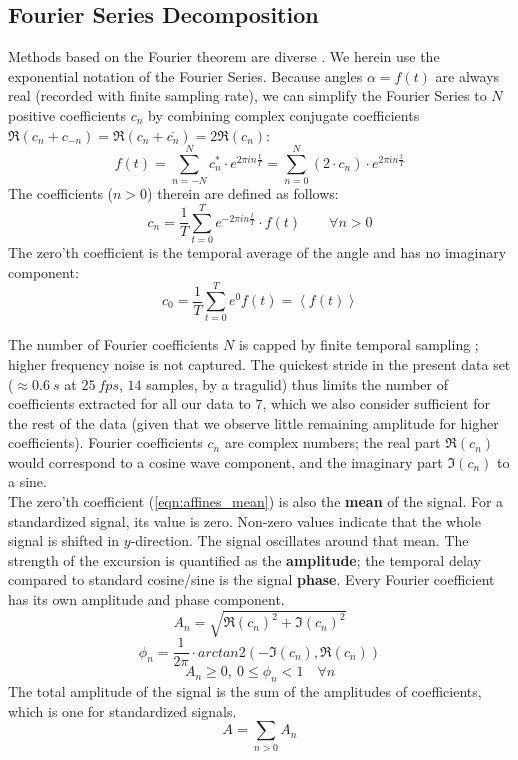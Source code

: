 \documentclass[9pt,twoside,lineno]{pnas-new}
\begin{document}
\subsection{Fourier Series Decomposition}\label{apdx:fourier}
Methods based on the Fourier theorem are diverse \cite{Fourier1822,Gray1995,Bracewell2000}. 
We herein use the exponential notation of the Fourier Series. 
Because angles $\alpha =f(t)$ are always real (recorded with finite sampling rate), we can simplify the Fourier Series to $N$ positive coefficients $c_{n}$ by combining complex conjugate coefficients $\Re(c_n + c_{-n}) = \Re(c_n + \overline{c_n}) = 2\Re(c_{n})$:
	\begin{equation}\label{eqn:fourier_series}
	f(t) = \sum\limits_{n=-N}^{N} c^{*}_{n}\cdot e^{2\pi i n \frac{t}{T}} = \sum\limits_{n=0}^{N} (2\cdot c_{n})\cdot e^{2\pi i n \frac{t}{T}}
	\end{equation}
The coefficients ($n>0$) therein are defined as follows:
	\begin{equation}\label{eqn:fourier_coefficients}
	c_{n} = \frac{1}{T}\sum\limits_{t=0}^{T} e^{-2\pi i n \frac{t}{T}} \cdot f(t)  \quad\quad \forall n>0
	\end{equation}
	The zero'th coefficient is the temporal average of the angle and has no imaginary component: 
	\begin{equation}\label{eqn:affines_mean}
	c_{0} = \frac{1}{T}\sum\limits_{t=0}^{T} e^{0} f(t) = \left\langle f(t)  \right\rangle
	\end{equation}

The number of Fourier coefficients $N$ is capped by finite temporal sampling \cite[Nyquist–Shannon sampling theorem,][]{Nyquist1928,Shannon1949}; higher frequency noise is not captured. 
The quickest stride in the present data set ($\approx 0.6\ s$ at $25\ fps$, $14$ samples, by a tragulid) thus limits the number of coefficients extracted for all our data to $7$, which we also consider sufficient for the rest of the data (given that we observe little remaining amplitude for higher coefficients). 
Fourier coefficients $c_{n}$ are complex numbers; the real part $\Re(c_{n})$ would correspond to a cosine wave component, and the imaginary part $\Im(c_{n})$ to a sine. 
\bigskip\\The zero'th coefficient (\eqref{eqn:affines_mean}) is also the \textbf{mean} of the signal. 
For a standardized signal, its value is zero. 
Non-zero values indicate that the whole signal is shifted in $y$-direction. 
The signal oscillates around that mean. 
The strength of the excursion is quantified as the \textbf{amplitude}; the temporal delay compared to standard cosine/sine is the signal \textbf{phase}. 
Every Fourier coefficient has its own amplitude and phase component. 
$$A_{n} = \sqrt{\Re(c_{n})^{2}+\Im(c_{n})^{2}}$$
$$\phi_{n} = \frac{1}{2\pi}\cdot arctan2\left( -\Im(c_{n}),\Re(c_{n})\right)$$
$$A_{n} \ge 0,\ 0 \le \phi_{n} < 1 \quad \forall n$$
The total amplitude of the signal is the sum of the amplitudes of coefficients, which is one for standardized signals. 
	\begin{equation}\label{eqn:affines_amplitude}
	A = \sum\limits_{n > 0} A_{n}
	\end{equation}
\end{document}
